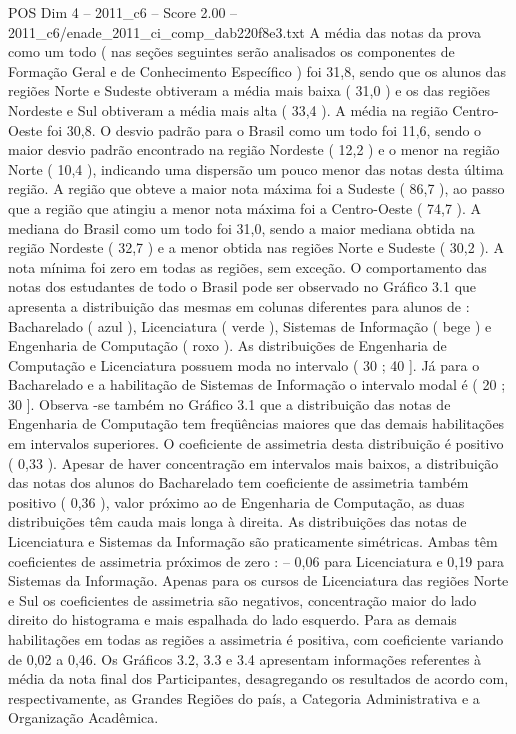 \begin{textsample}{POS Dim 4 – 2011\_c6 – Score 2.00 – 2011\_c6/enade\_2011\_ci\_comp\_dab220f8e3.txt}
A média das notas da prova como um todo ( nas seções seguintes serão analisados os componentes de Formação Geral e de Conhecimento Específico ) foi 31,8, sendo que os alunos das regiões Norte e Sudeste obtiveram a média mais baixa ( 31,0 ) e os das regiões Nordeste e Sul obtiveram a média mais alta ( 33,4 ).
A média na região Centro-Oeste foi 30,8.
O desvio padrão para o Brasil como um todo foi 11,6, sendo o maior desvio padrão encontrado na região Nordeste ( 12,2 ) e o menor na região Norte ( 10,4 ), indicando uma dispersão um pouco menor das notas desta última região.
A região que obteve a maior nota máxima foi a Sudeste ( 86,7 ), ao passo que a região que atingiu a menor nota máxima foi a Centro-Oeste ( 74,7 ).
A mediana do Brasil como um todo foi 31,0, sendo a maior mediana obtida na região Nordeste ( 32,7 ) e a menor obtida nas regiões Norte e Sudeste ( 30,2 ).
A nota mínima foi zero em todas as regiões, sem exceção.
O comportamento das notas dos estudantes de todo o Brasil pode ser observado no Gráfico 3.1 que apresenta a distribuição das mesmas em colunas diferentes para alunos de : Bacharelado ( azul ), Licenciatura ( verde ), Sistemas de Informação ( bege ) e Engenharia de Computação ( roxo ).
As distribuições de Engenharia de Computação e Licenciatura possuem moda no intervalo ( 30 ; 40 ].
Já para o Bacharelado e a habilitação de Sistemas de Informação o intervalo modal é ( 20 ; 30 ].
Observa -se também no Gráfico 3.1 que a distribuição das notas de Engenharia de Computação tem freqüências maiores que das demais habilitações em intervalos superiores.
O coeficiente de assimetria desta distribuição é positivo ( 0,33 ).
Apesar de haver concentração em intervalos mais baixos, a distribuição das notas dos alunos do Bacharelado tem coeficiente de assimetria também positivo ( 0,36 ), valor próximo ao de Engenharia de Computação, as duas distribuições têm cauda mais longa à direita.
As distribuições das notas de Licenciatura e Sistemas da Informação são praticamente simétricas.
Ambas têm coeficientes de assimetria próximos de zero : – 0,06 para Licenciatura e 0,19 para Sistemas da Informação.
Apenas para os cursos de Licenciatura das regiões Norte e Sul os coeficientes de assimetria são negativos, concentração maior do lado direito do histograma e mais espalhada do lado esquerdo.
Para as demais habilitações em todas as regiões a assimetria é positiva, com coeficiente variando de 0,02 a 0,46.
Os Gráficos 3.2, 3.3 e 3.4 apresentam informações referentes à média da nota final dos Participantes, desagregando os resultados de acordo com, respectivamente, as Grandes Regiões do país, a Categoria Administrativa e a Organização Acadêmica.

\end{textsample}
